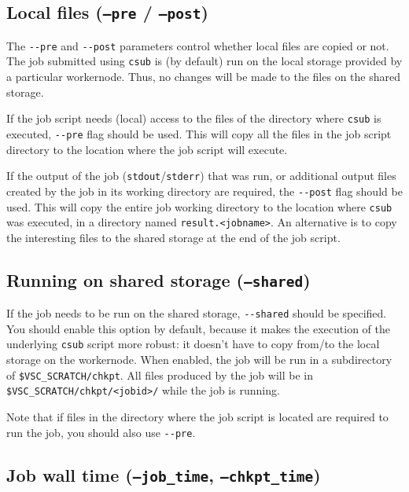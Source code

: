 \subsection{Local files (\texttt{--pre} / \texttt{--post})}

The \lstinline|--pre| and \lstinline|--post| parameters control whether local files
are copied or not. The job submitted using \lstinline|csub| is (by default) run on the local
storage provided by a particular workernode. Thus, no changes will be made to the
files on the shared storage.

If the job script needs (local) access to the files of the directory where \lstinline|csub|
is executed, \lstinline|--pre| flag should be used. This will copy all the files in the job
script directory to the location where the job script will execute.

If the output of the job (\lstinline|stdout|/\lstinline|stderr|) that was run,
or additional output files created by the job in its working directory are required,
the \lstinline|--post| flag should be used. This will copy the entire job working directory
to the location where \lstinline|csub| was executed, in a directory named \lstinline|result.<jobname>|.
An alternative is to copy the interesting files to the shared storage at the end of the job script.


\subsection{Running on shared storage (\texttt{--shared})}

If the job needs to be run on the shared storage, \lstinline|--shared| should be specified.
You should enable this option by default, because it makes the execution of the
underlying \lstinline|csub| script more robust: it doesn't have to copy from/to
the local storage on the workernode. When enabled, the job will be run in a
subdirectory of \lstinline|$VSC_SCRATCH/chkpt|. All files produced by the job will
be in \lstinline|$VSC_SCRATCH/chkpt/<jobid>/| while the job is running.

Note that if files in the directory where the job script is located are required to
run the job, you should also use \lstinline|--pre|.

\subsection{Job wall time (\texttt{--job\_time}, \texttt{--chkpt\_time})}

